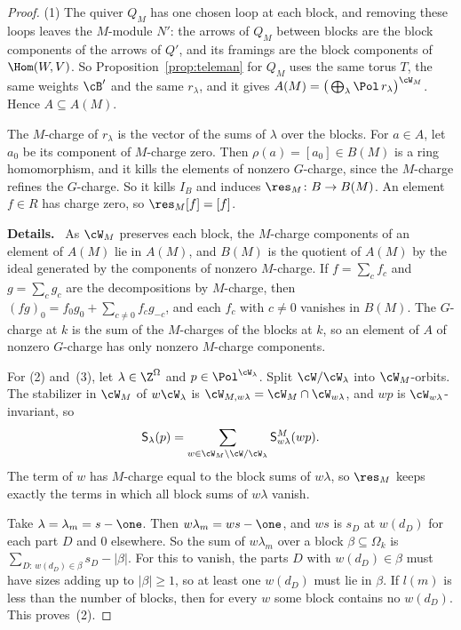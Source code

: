 \documentclass[11pt]{amsart}
\newenvironment{details}{\par\color{black!60!green}\noindent\textbf{Details.}\ }{\par}
\begin{document}
\begin{proof}
(1) The quiver $Q_M$ has one chosen loop at each block, and removing these
loops leaves the $M$-module $N'$: the arrows of $Q_M$ between blocks are the
block components of the arrows of $Q'$, and its framings are the block
components of $\Hom(W,V)$.  So Proposition~\ref{prop:teleman} for $Q_M$ uses
the same torus $T$, the same weights $\cB'$ and the same $r_\lambda$, and it
gives $A(M)=\big(\bigoplus_\lambda\Pol\,r_\lambda\big)^{\cW_M}$.  Hence
$A\subseteq A(M)$.

The $M$-charge of $r_\lambda$ is the vector of the sums of $\lambda$ over the
blocks.  For $a\in A$, let $a_0$ be its component of $M$-charge zero.  Then
$\rho(a)=[a_0]\in B(M)$ is a ring homomorphism, and it kills the elements of
nonzero $G$-charge, since the $M$-charge refines the $G$-charge.  So it kills
$I_B$ and induces $\res_M\colon B\to B(M)$.  An element $f\in R$ has charge
zero, so $\res_M[f]=[f]$.
\begin{details}
As $\cW_M$ preserves each block, the $M$-charge components of an
element of $A(M)$ lie in $A(M)$, and $B(M)$ is the quotient of $A(M)$ by the
ideal generated by the components of nonzero $M$-charge.  If $f=\sum_cf_c$
and $g=\sum_cg_c$ are the decompositions by $M$-charge, then
$(fg)_0=f_0g_0+\sum_{c\neq0}f_cg_{-c}$, and each $f_c$ with $c\neq0$ vanishes
in $B(M)$.  The $G$-charge at $k$ is the
sum of the $M$-charges of the blocks at $k$, so an element of $A$ of nonzero
$G$-charge has only nonzero $M$-charge components.
\end{details}

For (2) and~(3), let $\lambda\in\Z^\Omega$ and $p\in\Pol^{\cW_\lambda}$.  Split
$\cW/\cW_\lambda$ into $\cW_M$-orbits.  The stabilizer in $\cW_M$ of
$w\cW_\lambda$ is $\cW_{M,w\lambda}=\cW_M\cap\cW_{w\lambda}$, and $wp$ is
$\cW_{w\lambda}$-invariant, so
\[
 \mathsf S_\lambda(p)=\sum_{w\in\cW_M\backslash\cW/\cW_\lambda}\mathsf
 S^M_{w\lambda}(wp).
\]
The term of $w$ has $M$-charge equal to the block sums of $w\lambda$, so
$\res_M$ keeps exactly the terms in which all block sums of $w\lambda$
vanish.

Take $\lambda=\lambda_m=s-\one$.  Then $w\lambda_m=ws-\one$, and $ws$ is $s_D$
at $w(d_D)$ for each part $D$ and $0$ elsewhere.  So the sum of $w\lambda_m$
over a block $\beta\subseteq\Omega_k$ is
$\sum_{D:\,w(d_D)\in\beta}s_D-|\beta|$.  For this to vanish, the parts $D$ with
$w(d_D)\in\beta$ must have sizes adding up to $|\beta|\ge1$, so at least one
$w(d_D)$ must lie in $\beta$.  If $l(m)$ is less than the number of blocks,
then for every $w$ some block contains no $w(d_D)$.  This proves~(2).


\end{proof}
\end{document}
